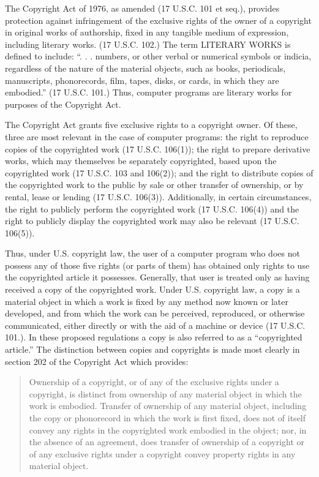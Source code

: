 \begin{select}
The Copyright Act of 1976, as amended (17 U.S.C. 101 et seq.), provides protection against infringement of the exclusive rights of the owner of a copyright in original works of authorship, fixed in any tangible medium of expression, including literary works. (17 U.S.C. 102.) The term LITERARY WORKS is defined to include: ``. . . numbers, or other verbal or numerical symbols or indicia, regardless of the nature of the material objects, such as books, periodicals, manuscripts, phonorecords, film, tapes, disks, or cards, in which they are embodied.'' (17 U.S.C. 101.) Thus, computer programs are literary works for purposes of the Copyright Act.

The Copyright Act grants five exclusive rights to a copyright owner. Of these, three are most relevant in the case of computer programs: the right to reproduce copies of the copyrighted work (17 U.S.C. 106(1)); the right to prepare derivative works, which may themselves be separately copyrighted, based upon the copyrighted work (17 U.S.C. 103 and 106(2)); and the right to distribute copies of the copyrighted work to the public by sale or other transfer of ownership, or by rental, lease or lending (17 U.S.C. 106(3)). Additionally, in certain circumstances, the right to publicly perform the copyrighted work (17 U.S.C. 106(4)) and the right to publicly display the copyrighted work may also be relevant (17 U.S.C. 106(5)).

Thus, under U.S. copyright law, the user of a computer program who does not possess any of those five rights (or parts of them) has obtained only rights to use the copyrighted article it possesses. Generally, that user is treated only as having received a copy of the copyrighted work. Under U.S. copyright law, a copy is a material object in which a work is fixed by any method now known or later developed, and from which the work can be perceived, reproduced, or otherwise communicated, either directly or with the aid of a machine or device (17 U.S.C. 101.). In these proposed regulations a copy is also referred to as a ``copyrighted article.'' The distinction between copies and copyrights is made most clearly in section 202 of the Copyright Act which provides:

\begin{quote}
Ownership of a copyright, or of any of the exclusive rights
under a copyright, is distinct from ownership of any material
object in which the work is embodied. Transfer of ownership of
any material object, including the copy or phonorecord in which
the work is first fixed, does not of itself convey any rights in
the copyrighted work embodied in the object; nor, in the absence
of an agreement, does transfer of ownership of a copyright or of
any exclusive rights under a copyright convey property rights in
any material object.
\end{quote}


\end{select}
